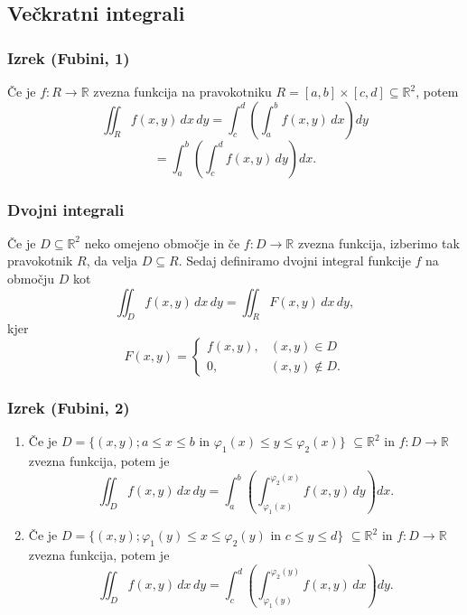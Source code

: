 \documentclass{article}
\begin{document}
\begin{multicols}{2}
\subsection{Večkratni integrali}

\subsubsection{Izrek (Fubini, 1)} 
Če je \( f: R \rightarrow \mathbb{R} \) zvezna funkcija na pravokotniku \( R = [a, b] \times [c, d] \subseteq \mathbb{R}^2 \), potem
\[
\iint_R f(x,y) \,dx\,dy = \int_c^d \left( \int_a^b f(x,y) \,dx \right) dy
\]
\[
= \int_a^b \left( \int_c^d f(x,y) \,dy \right) dx.
\]


\subsubsection{Dvojni integrali}

Če je \( D \subseteq \mathbb{R}^2 \) neko omejeno območje in če \( f: D \rightarrow \mathbb{R} \) zvezna funkcija, izberimo tak pravokotnik \( R \), da velja \( D \subseteq R \). Sedaj definiramo dvojni integral funkcije \( f \) na območju \( D \) kot
\[
\iint_D f(x,y) \,dx\,dy = \iint_R F(x,y) \,dx\,dy,
\]
kjer
\[
F(x,y) = \begin{cases} 
f(x,y), & (x,y) \in D \\
0, & (x,y) \not\in D.
\end{cases}
\]

\subsubsection{Izrek (Fubini, 2)} 
\begin{enumerate}
\item Če je \( D = \{(x,y); a \leq x \leq b \text{ in } \varphi_1(x) \leq y \leq \varphi_2(x)\} \) \( \subseteq \mathbb{R}^2 \) in \( f: D \rightarrow \mathbb{R} \) zvezna funkcija, potem je
\[
\iint_D f(x,y) \,dx\,dy = \int_a^b \left( \int_{\varphi_1(x)}^{\varphi_2(x)} f(x,y) \,dy \right) dx.
\]

\item Če je \( D = \{(x,y); \varphi_1(y) \leq x \leq \varphi_2(y) \text{ in } c \leq y \leq d\} \) \( \subseteq \mathbb{R}^2 \) in \( f: D \rightarrow \mathbb{R} \) zvezna funkcija, potem je
\[
\iint_D f(x,y) \,dx\,dy = \int_c^d \left( \int_{\varphi_1(y)}^{\varphi_2(y)} f(x,y) \,dx \right) dy.
\]
\end{enumerate}


\end{multicols}
\end{document}
